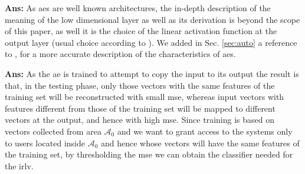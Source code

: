 \documentclass[draftcls,onecolumn,12pt]{IEEEtran}
\begin{document}
{
{\bf Ans:} As \acp{ae} are well known architectures, the in-depth description of the meaning of the low dimensional layer as well as its derivation is beyond the scope of this paper, as well it is the choice of the linear activation function at the output layer (usual choice according to \cite[Chapter 14]{Goodfellow}). We added in Sec. \ref{sec:auto} a reference to \cite[Chapter 14]{Goodfellow}, for a more accurate description of the characteristics of \acp{ae}.

\vspace{5mm} %
\begin{framed}
\end{framed}

{\bf Ans:} As the \ac{ae} is trained to attempt to copy the input to its output the result is that, in the testing phase, only those vectors with the same features of the training set will be reconstructed with small \ac{mse}, whereas input vectors with features different from those of the training set will be mapped to different vectors at the output, and hence with high \ac{mse}. Since training is based on vectors collected from area $\mathcal{A}_0$ and we want to grant access to the systems only to users located inside $\mathcal{A}_0$ and hence whose vectors will have the same features of the training set, by thresholding the \ac{mse} we can obtain the classifier needed for the \ac{irlv}.

}
\end{document}
